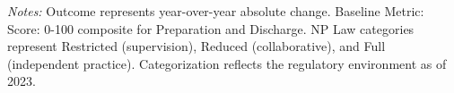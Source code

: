 \begin{table}[htbp]
    \centering
    \caption{Summary of Change in OAS CAHPS: Prep \& Discharge by Authority and Year}
    \label{tab:d_oas_grp3}
    \vspace{0.2cm}
    \vspace{0.1cm}
    \begin{minipage}{\textwidth}
        \footnotesize \textit{Notes:} Outcome represents year-over-year absolute change. Baseline Metric: Score: 0-100 composite for Preparation and Discharge. NP Law categories represent Restricted (supervision), Reduced (collaborative), and Full (independent practice). Categorization reflects the regulatory environment as of 2023.
    \end{minipage}
\end{table}